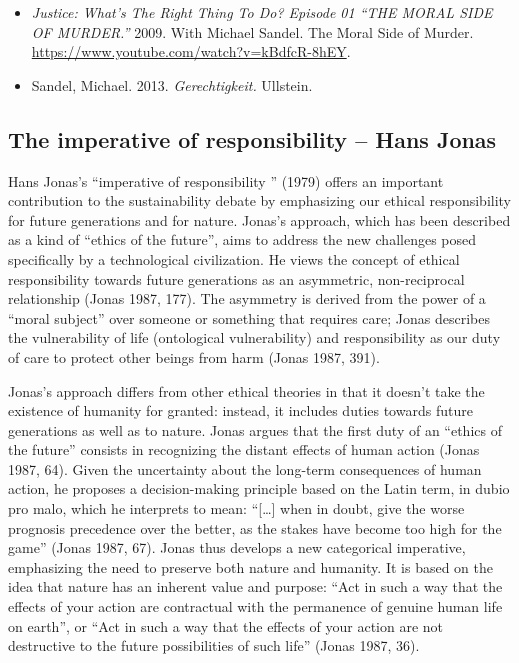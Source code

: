 \documentclass[
  a4paper,
  DIV=11,
  numbers=noendperiod,
  oneside,
  openany]{scrreprt}
\begin{document}
\begin{tcolorbox}[enhanced jigsaw, arc=.35mm, bottomrule=.15mm, bottomtitle=1mm, breakable, colback=white, colbacktitle=quarto-callout-caution-color!10!white, colframe=quarto-callout-caution-color-frame, coltitle=black, left=2mm, leftrule=.75mm, opacityback=0, opacitybacktitle=0.6, rightrule=.15mm, title={Further reading}, titlerule=0mm, toprule=.15mm, toptitle=1mm]

\begin{itemize}
\item
  \emph{Justice: What's The Right Thing To Do? Episode 01 ``THE MORAL
  SIDE OF MURDER.''} 2009. With Michael Sandel. The Moral Side of
  Murder. \url{https://www.youtube.com/watch?v=kBdfcR-8hEY}.
\item
  Sandel, Michael. 2013. \emph{Gerechtigkeit.} Ullstein.
\end{itemize}

\end{tcolorbox}

\subsection{The imperative of responsibility -- Hans
Jonas}\label{the-imperative-of-responsibility-hans-jonas}

Hans Jonas's ``imperative of responsibility '' (1979) offers an
important contribution to the sustainability debate by emphasizing our
ethical responsibility for future generations and for nature. Jonas's
approach, which has been described as a kind of ``ethics of the
future'', aims to address the new challenges posed specifically by a
technological civilization. He views the concept of ethical
responsibility towards future generations as an asymmetric,
non-reciprocal relationship (Jonas 1987, 177). The asymmetry is derived
from the power of a ``moral subject'' over someone or something that
requires care; Jonas describes the vulnerability of life (ontological
vulnerability) and responsibility as our duty of care to protect other
beings from harm (Jonas 1987, 391).

Jonas's approach differs from other ethical theories in that it doesn't
take the existence of humanity for granted: instead, it includes duties
towards future generations as well as to nature. Jonas argues that the
first duty of an ``ethics of the future'' consists in recognizing the
distant effects of human action (Jonas 1987, 64). Given the uncertainty
about the long-term consequences of human action, he proposes a
decision-making principle based on the Latin term, in dubio pro malo,
which he interprets to mean: ``{[}\ldots{]} when in doubt, give the
worse prognosis precedence over the better, as the stakes have become
too high for the game'' (Jonas 1987, 67). Jonas thus develops a new
categorical imperative, emphasizing the need to preserve both nature and
humanity. It is based on the idea that nature has an inherent value and
purpose: ``Act in such a way that the effects of your action are
contractual with the permanence of genuine human life on earth'', or
``Act in such a way that the effects of your action are not destructive
to the future possibilities of such life'' (Jonas 1987, 36).
\end{document}
